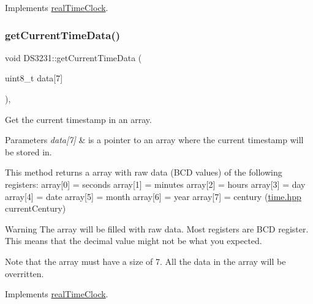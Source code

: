 Implements \mbox{\hyperlink{classreal_time_clock_a8fe956100fc4e339cd68ab413465f666}{real\+Time\+Clock}}.

\mbox{\label{class_d_s3231_a0ca41c2242367c5ff1424d1b12f909c5}} 
\subsubsection{\texorpdfstring{get\+Current\+Time\+Data()}{getCurrentTimeData()}}
{\footnotesize\ttfamily void D\+S3231\+::get\+Current\+Time\+Data (\begin{DoxyParamCaption}\item[{uint8\+\_\+t}]{data\mbox{[}7\mbox{]} }\end{DoxyParamCaption})\hspace{0.3cm}{\ttfamily [override]}, {\ttfamily [virtual]}}



Get the current timestamp in an array. 


\begin{DoxyParams}{Parameters}
{\em data\mbox{[}7\mbox{]}} & is a pointer to an array where the current timestamp will be stored in.\\
\hline
\end{DoxyParams}
This method returns a array with raw data (B\+CD values) of the following registers\+: array\mbox{[}0\mbox{]} = seconds array\mbox{[}1\mbox{]} = minutes array\mbox{[}2\mbox{]} = hours array\mbox{[}3\mbox{]} = day array\mbox{[}4\mbox{]} = date array\mbox{[}5\mbox{]} = month array\mbox{[}6\mbox{]} = year array\mbox{[}7\mbox{]} = century (\mbox{\hyperlink{time_8hpp_source}{time.\+hpp}} current\+Century) \begin{DoxyWarning}{Warning}
The array will be filled with raw data. Most registers are B\+CD register. This means that the decimal value might not be what you expected. 

Note that the array must have a size of 7. All the data in the array will be overritten. 
\end{DoxyWarning}


Implements \mbox{\hyperlink{classreal_time_clock_a2d1613b3cd572f62bc9faaea6a0f82f2}{real\+Time\+Clock}}.

\mbox{\label{class_d_s3231_a04e087a918d2d48b0cdd2e3c6c2f595f}} 
